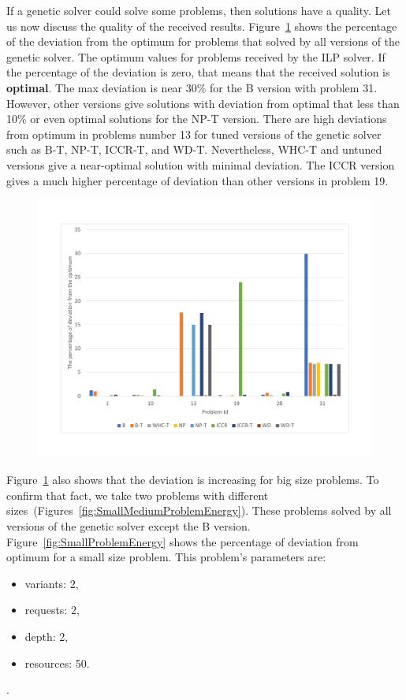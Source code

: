 If a genetic solver could solve some problems, then solutions have a quality.
Let us now discuss the quality of the received results. Figure~\ref{fig:EnergyPercentage} shows the percentage of the deviation from the optimum for problems that solved by all versions of the genetic solver. The optimum values for problems received by the ILP solver. If the percentage of the deviation is zero, that means that the received solution is \textbf{optimal}. The max deviation is near 30\% for the B version with problem 31. However, other versions give solutions with deviation from optimal that less than 10\% or even optimal solutions for the NP-T version. There are high deviations from optimum in problems number 13 for tuned versions of the genetic solver such as B-T, NP-T, ICCR-T, and WD-T. Nevertheless, WHC-T and untuned versions give a near-optimal solution with minimal deviation. The ICCR version gives a much higher percentage of deviation than other versions in problem 19.

\begin{figure}
	\centering
	\includegraphics[width=\textwidth]{images/EnergyPercentage.pdf}
	\caption[]{}
	\label{fig:EnergyPercentage}
\end{figure}

Figure~\ref{fig:EnergyPercentage} also shows that the deviation is increasing for big size problems. To confirm that fact, we take two problems with different sizes~(Figures~\ref{fig:SmallMediumProblemEnergy}). These problems solved by all versions of the genetic solver except the B version. Figure~\ref{fig:SmallProblemEnergy} shows the percentage of deviation from optimum for a small size problem. This problem's parameters are:
\begin{itemize}
	\item variants: 2,
	\item requests: 2,
	\item depth: 2,
	\item resources: 50.
\end{itemize}.

